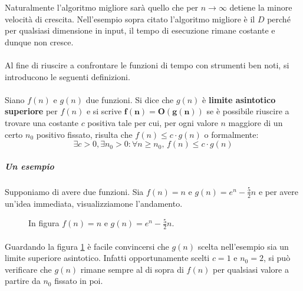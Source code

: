\documentclass[11pt,a4paper,oneside]{article}
\begin{document}
Naturalmente l'algoritmo migliore sarà quello che per $n \to \infty$ detiene la minore velocità di crescita. Nell'esempio sopra citato l'algoritmo migliore è il $D$ perché per qualsiasi dimensione in input, il tempo di esecuzione rimane costante e dunque non cresce.

\paragraph*{} Al fine di riuscire a confrontare le funzioni di tempo con strumenti ben noti, si introducono le seguenti definizioni.
\paragraph{} Siano $f(n)$ e $g(n)$ due funzioni. Si dice che $g(n)$ è \textbf{limite asintotico superiore} per $f(n)$ e si scrive $\bm{f(n) = O(g(n))}$ se è possibile riuscire a trovare una costante $c$ positiva tale per cui, per ogni valore $n$ maggiore di un certo $n_0$ positivo fissato, risulta che $f(n) \leq  c\cdot g(n)$ o formalmente: $$\exists c>0, \exists n_0 > 0 : \forall n \geq n_0,\,f(n) \leq c\cdot g(n)$$
\subparagraph*{Un esempio} Supponiamo di avere due funzioni. Sia $f(n) = n$ e $g(n) = e^n-\frac{5}{2}n$ e per avere un'idea immediata, visualizziamone l'andamento.

\begin{figure}[hb]
\centering
{}
\caption{In figura $f(n) = n$ e $g(n) = e^n-\frac{5}{2}n$.}
\label{fig:asymsup}
\end{figure}

\paragraph*{}Guardando la figura \ref{fig:asymsup} è facile convincersi che $g(n)$ scelta nell'esempio sia un limite superiore asintotico. Infatti opportunamente scelti $c = 1$ e $n_0 = 2$, si può verificare che $g(n)$ rimane sempre al di sopra di $f(n)$ per qualsiasi valore a partire da $n_0$ fissato in poi.\\
\end{document}
